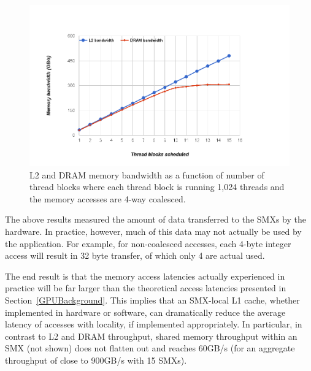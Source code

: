 \begin{figure}
\center
\includegraphics[scale=0.3]{DRAML2Bandwidth-4wayCoalesced.png}
\caption{\footnotesize\textnormal{L2 and DRAM memory bandwidth as a function of number of thread blocks where each thread
block is running 1,024 threads and the memory accesses are 4-way coalesced.
}}
\label{fig:L2-DRAM-bandwidth}
\end{figure}

The above results measured the amount of data transferred to the SMXs by the
hardware.
In practice, however, much of this data may not actually be used by the
application.
For example, for non-coalesced accesses, each 4-byte integer access will result in 32
byte transfer, of which only 4 are actual used.

The end result is that the memory access latencies actually experienced in
practice will be far larger than the theoretical access latencies presented in
Section~\ref{GPUBackground}.
This implies that an SMX-local L1 cache, whether implemented in hardware or software, can
dramatically reduce the average latency of accesses with locality, if implemented appropriately.
In particular, in contrast to L2 and DRAM throughput,  shared memory throughput within an SMX (not shown) does not flatten out and reaches 60GB/s (for an aggregate throughput of close to 900GB/s with 15 SMXs).








